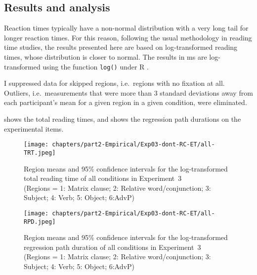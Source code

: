 \subsection{Results and analysis}

Reaction times typically have a non-normal distribution with a very long tail for longer reaction times. For this reason, following the usual methodology in reading time studies, the results presented here are based on log-transformed reading times, whose distribution is closer to normal. The results in ms are log-transformed using the function \texttt{log()} under R \citep{R}.

I suppressed data for skipped regions, i.e.\ regions with no fixation at all. Outliers, i.e.\ measurements that were more than 3 standard deviations away from each participant's mean for a given region in a given condition, were eliminated.

 shows the total reading times, and  shows the regression path durations on the experimental items.

\begin{figure}
    \centering
    \texttt{[image: chapters/part2-Empirical/Exp03-dont-RC-ET/all-TRT.jpeg]}
    \caption[Region means and 95\% confidence intervals for the log-transformed total reading times of all conditions in Experiment~3]{Region means and 95\% confidence intervals for the log-transformed total reading time of all conditions in Experiment~3\\
    (Regions = 1: Matrix clause; 2: Relative word/conjunction; 3: Subject; 4: Verb; 5: Object; 6:AdvP)}
    \label{fig:exp03-all-TRT-main}
\end{figure}

\begin{figure}
    \centering
    \texttt{[image: chapters/part2-Empirical/Exp03-dont-RC-ET/all-RPD.jpeg]}
    \caption[Region means and 95\% confidence intervals for the log-transformed regression path durations of all conditions in Experiment~3]{Region means and 95\% confidence intervals for the log-transformed regression path duration of all conditions in Experiment~3\\
    (Regions = 1: Matrix clause; 2: Relative word/conjunction; 3: Subject; 4: Verb; 5: Object; 6:AdvP)}
    \label{fig:exp03-all-RPD-main}
\end{figure}

